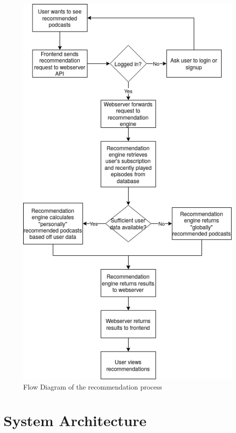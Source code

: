 \documentclass[12pt]{article}
\begin{document}
\begin{figure}[h]
    \centering
    \includegraphics[height=0.5\paperheight]{resources/recommendation_engine}
    \caption{Flow Diagram of the recommendation process}
    \label{fig:recommendation_engine_flowchart}
\end{figure}

\section{System Architecture}
\end{document}
